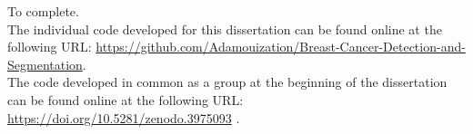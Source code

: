To complete.\\

The individual code developed for this dissertation can be found online at the following URL: \url{https://github.com/Adamouization/Breast-Cancer-Detection-and-Segmentation}.\\

The code developed in common as a group at the beginning of the dissertation can be found online at the following URL: \url{https://doi.org/10.5281/zenodo.3975093} \citep{adam_jaamour_2020_3975093}.